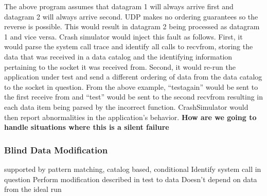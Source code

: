             The above program assumes that datagram 1 will always arrive first and datagram 2 will always arrive second. UDP
            makes no ordering guarantees so the reverse is possible. This would result in datagram 2 being processed as
            datagram 1 and vice versa. Crash simulator would inject this fault as follows. First, it would parse the system
            call trace and identify all calls to recvfrom, storing the data that was received in a data catalog and the
            identifying information pertaining to the socket it was received from. Second, it would re-run the application
            under test and send a different ordering of data from the data catalog to the socket in question. From the above
            example, ``testagain'' would be sent to the first receive from and ``test'' would be sent to the second recvfrom
            resulting in each data item being parsed by the incorrect function. CrashSimulator would then report
            abnormalities in the application's behavior. \textbf{How are we going to handle situations where this is a
            silent failure}

        \subsubsection{Blind Data Modification}

            supported by pattern matching, catalog based, conditional
            Identify system call in question
            Perform modification described in test to data
            Doesn't depend on data from the ideal run
